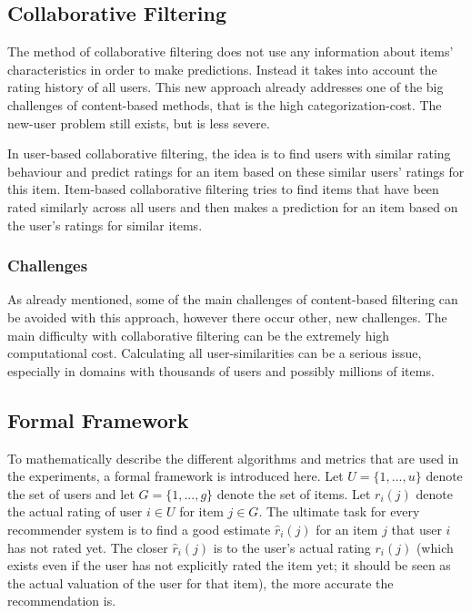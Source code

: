 \subsection{Collaborative Filtering}
\label{sst:collaborativefiltering} The method of collaborative filtering does not use any information about items' characteristics in order to make predictions. Instead it takes into account the rating history of all users. This new approach already addresses one of the big challenges of content-based methods, that is the high categorization-cost. The new-user problem still exists, but is less severe.

In user-based collaborative filtering, the idea is to find users with similar rating behaviour and predict ratings for an item based on these similar users' ratings for this item. Item-based collaborative filtering tries to find items that have been rated similarly across all users and then makes a prediction for an item based on the user's ratings for similar items.

\subsubsection{Challenges}
\label{ssst:challengescf} As already mentioned, some of the main challenges of content-based filtering can be avoided with this approach, however there occur other, new challenges. The main difficulty with collaborative filtering can be the extremely high computational cost. Calculating all user-similarities can be a serious issue, especially in domains with thousands of users and possibly millions of items.

\subsection{Formal Framework}
\label{sst:formalframework} To mathematically describe the different algorithms and metrics that are used in the experiments, a formal framework is introduced here. Let $U = \{1,...,u\}$ denote the set of users and let $G = \{1,...,g\}$ denote the set of items. Let $r_i(j)$ denote the actual rating of user $i \in U$ for item $j \in G$. The ultimate task for every recommender system is to find a good estimate $\hat{r}_i(j)$ for an item $j$ that user $i$ has not rated yet. The closer $\hat{r}_i(j)$ is to the user's actual rating $r_i(j)$ (which exists even if the user has not explicitly rated the item yet; it should be seen as the actual valuation of the user for that item), the more accurate the recommendation is.

